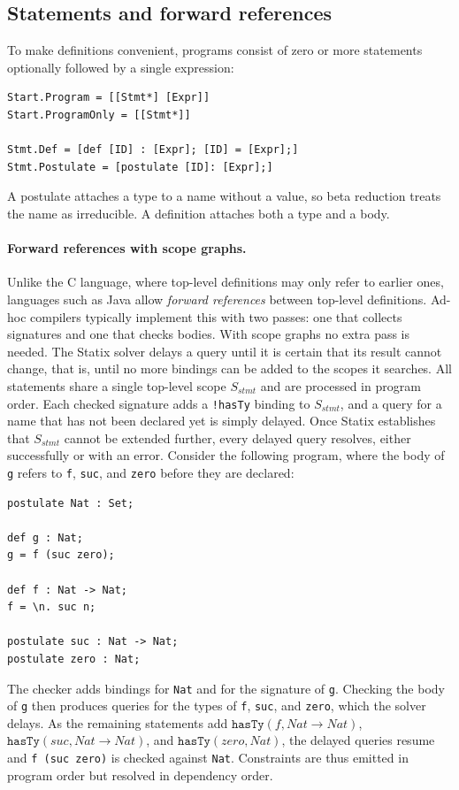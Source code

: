 \subsection{Statements and forward references}

To make definitions convenient, programs consist of zero or more statements
optionally followed by a single expression:
\begin{lstlisting}[language=SDF3, caption=Syntax for statements]
Start.Program = [[Stmt*] [Expr]]
Start.ProgramOnly = [[Stmt*]]
  
Stmt.Def = [def [ID] : [Expr]; [ID] = [Expr];]
Stmt.Postulate = [postulate [ID]: [Expr];]
\end{lstlisting}
A postulate attaches a type to a name without a value, so beta reduction treats
the name as irreducible. A definition attaches both a type and a body.

\paragraph{Forward references with scope graphs.} Unlike the C language, where top-level
definitions may only refer to earlier ones, languages such as Java allow
\emph{forward references} between top-level definitions. Ad-hoc compilers
typically implement this with two passes: one that collects signatures and one
that checks bodies. With scope graphs no extra pass is needed. The Statix
solver delays a query until it is certain that its result cannot change, that
is, until no more bindings can be added to the scopes it searches. All
statements share a single top-level scope $S_{stmt}$ and are processed in
program order. Each checked signature adds a \texttt{!hasTy} binding to
$S_{stmt}$, and a query for a name that has not been declared yet is simply delayed.
Once Statix establishes that $S_{stmt}$ cannot be extended further, every delayed
query resolves, either successfully or with an error. Consider the following
program, where the body of \texttt{g} refers to \texttt{f}, \texttt{suc}, and
\texttt{zero} before they are declared:

\begin{lstlisting}[caption=Forward references between statements, label=listing:forward-references]
postulate Nat : Set;

def g : Nat;
g = f (suc zero);

def f : Nat -> Nat;
f = \n. suc n;

postulate suc : Nat -> Nat;
postulate zero : Nat;
\end{lstlisting}
The checker adds bindings for \texttt{Nat} and for the signature of \texttt{g}.
Checking the body of \texttt{g} then produces queries for the types of
\texttt{f}, \texttt{suc}, and \texttt{zero}, which the solver delays. As the
remaining statements add \(\texttt{hasTy}(f, Nat \to Nat)\),
\(\texttt{hasTy}(suc, Nat \to Nat)\), and \(\texttt{hasTy}(zero, Nat)\), the
delayed queries resume and \texttt{f (suc zero)} is checked against
\texttt{Nat}. Constraints are thus emitted in program order but resolved in
dependency order.

